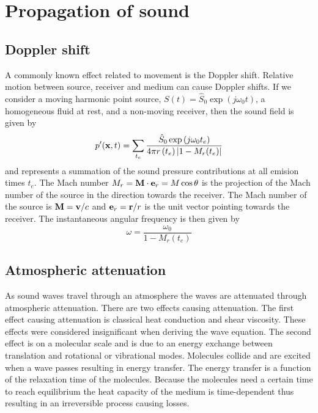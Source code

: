 \section{Propagation of sound}

\subsection{Doppler shift}
A commonly known effect related to movement is the Doppler shift.
Relative motion between source, receiver and medium can cause
Doppler shifts. If we consider a moving harmonic point source, $S(t) = \hat{S}_0
\exp{\left(j\omega_0 t\right)} $, a homogeneous fluid at rest, and a non-moving receiver, then the sound
field is given by
\begin{equation}
  p'(\mathbf{x},t) = \sum_{t_e} \frac{\hat{S}_0 \exp{\left(j \omega_0 t_e\right)}}{4\pi r \left(t_e\right) \lvert1-M_r (t_e)\rvert}
\end{equation}
and represents a summation of the sound pressure contributions at all emision
times $t_e$. The Mach number $M_r = \mathbf{M} \cdot \mathbf{e}_r = M \cos{\theta}$ is
the projection of the Mach number of the source in the direction towards the
receiver. The Mach number of the source is $\mathbf{M}=\mathbf{v}/c$ and
$\mathbf{e}_r=\mathbf{r}/r$ is the unit vector pointing towards the receiver.
The instantaneous angular frequency is then given by
\begin{equation}
  \omega = \frac{\omega_0}{1 - M_r(t_e)}
\end{equation}



\subsection{Atmospheric attenuation}\label{sec:theory_sound_atmospheric_attenuation}
As sound waves travel through an atmosphere the waves are attenuated through
atmospheric attenuation. There are two effects causing attenuation. The first
effect causing attenuation is classical heat conduction and shear viscosity.
These effects were considered insignificant when deriving the wave equation. The
second effect is on a molecular scale and is due to an energy exchange between
translation and rotational or vibrational modes. Molecules collide and are
excited when a wave passes resulting in energy transfer. The energy transfer is
a function of the relaxation time of the molecules. Because the molecules need a
certain time to reach equilibrium the heat capacity of the medium is
time-dependent thus resulting in an irreversible process causing losses.

